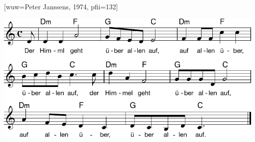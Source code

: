 [wuw={Peter Janssens, 1974}, pfii={132}]

\markboth{\songtitle}{\songtitle}

\beginverse
\endverse

\centering\includegraphics[width=1\textwidth]{Noten/Lied107a.pdf}

\endsong

\beginscripture

\endscripture

\begin{intersong}

\end{intersong}